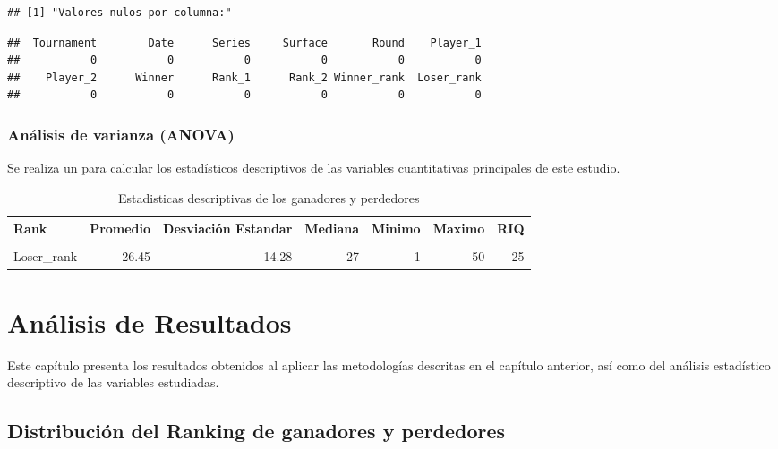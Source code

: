 \documentclass[oneside,11pt]{Latex/Classes/PhDthesisPSnPDF}
\begin{document}
\begin{verbatim}
## [1] "Valores nulos por columna:"
\end{verbatim}

\begin{verbatim}
##  Tournament        Date      Series     Surface       Round    Player_1 
##           0           0           0           0           0           0 
##    Player_2      Winner      Rank_1      Rank_2 Winner_rank  Loser_rank 
##           0           0           0           0           0           0
\end{verbatim}

\subsection{Análisis de varianza (ANOVA)}

Se realiza un para calcular los estadísticos descriptivos de las
variables cuantitativas principales de este estudio.

\begin{table}[!h]
\centering
\caption{\label{tab:unnamed-chunk-2}Estadisticas descriptivas de los ganadores y perdedores}
\centering
\fontsize{10}{12}\selectfont
\begin{tabular}[t]{lrrrrrr}
\toprule
Rank & Promedio & Desviación Estandar & Mediana & Minimo & Maximo & RIQ\\
\midrule
\cellcolor{gray!10}{Winner\_rank} & \cellcolor{gray!10}{19.47} & \cellcolor{gray!10}{14.59} & \cellcolor{gray!10}{16} & \cellcolor{gray!10}{1} & \cellcolor{gray!10}{50} & \cellcolor{gray!10}{24}\\
Loser\_rank & 26.45 & 14.28 & 27 & 1 & 50 & 25\\
\bottomrule
\end{tabular}
\end{table}

\chapter{Análisis de Resultados}

Este capítulo presenta los resultados obtenidos al aplicar las
metodologías descritas en el capítulo anterior, así como del análisis
estadístico descriptivo de las variables estudiadas.

\section{Distribución del Ranking de ganadores y perdedores}
\end{document}
